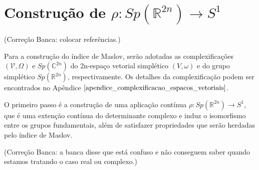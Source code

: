 \documentclass[12pt]{book}
\newcommand{\circulo}{S^{1}}
\newcommand{\complexificado}[1]{\mathcal{#1}}
\newcommand{\complexo}[1]{\mathbb{C}^{#1}}
\newcommand{\gruposimpletico}[1]{Sp(#1)}
\newcommand{\real}[1]{\mathbb{R}^{#1}}
\newcommand{\alerta}[1]{{\color{red}#1}}
\newcommand{\correcaobanca}[1]{\alerta{(Correção Banca: #1)}}
\begin{document}
	
	\section{Construção de $\rho: \gruposimpletico{\real{2n}} \to \circulo$}
	
	\correcaobanca{colocar referências.}
	
	Para a construção do índice de Maslov, serão adotadas as complexificações $(\complexificado{V}, \Omega) $ e $\gruposimpletico{\complexo{2n}}$ do 2n-espaço vetorial simplético $(V, \omega)$ e do grupo simplético $\gruposimpletico{\real{2n}}$, respectivamente. Os detalhes da complexificação podem ser encontrados no Apêndice $\ref{apendice_complexificacao_espacos_vetoriais}$. 
	
	O primeiro passo é a construção de uma aplicação contínua $\rho: \gruposimpletico{\real{2n}}\to \circulo$, que é uma extenção contínua do determinante complexo e induz o isomorfismo entre os grupos fundamentais, além de satisfazer propriedades que serão herdadas pelo índice de Maslov.
	
	\correcaobanca{a banca disse que está confuso e não conseguem saber quando estamos tratando o caso real ou complexo.}
	
\end{document}
